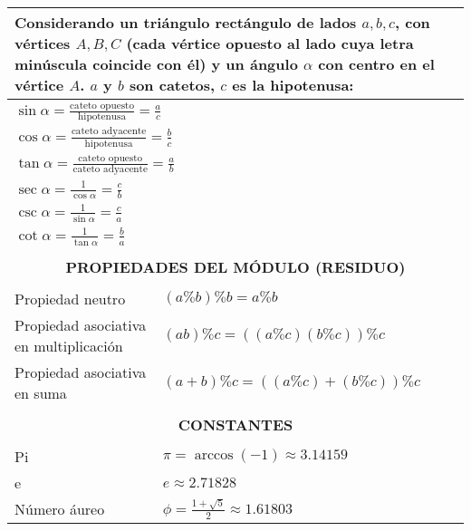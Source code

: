 \begin{center}
{\begin{tabular}{|p{}|p{}|}
\multicolumn{2}{|p{0.96\columnwidth}|}{Considerando un triángulo rectángulo de lados $a,b,c$, con vértices $A,B,C$ (cada vértice opuesto al lado cuya letra minúscula coincide con él) y un ángulo $\alpha$ con centro en el vértice $A$. $a$ y $b$ son catetos, $c$ es la hipotenusa:} \\ \hline

\multicolumn{2}{|p{0.96\columnwidth}|}{$\displaystyle \sin\alpha = \frac{\text{cateto opuesto}}{\text{hipotenusa}} = \frac{a}{c}$} \\ \hline
\multicolumn{2}{|p{0.96\columnwidth}|}{$\displaystyle \cos\alpha = \frac{\text{cateto adyacente}}{\text{hipotenusa}} = \frac{b}{c}$} \\ \hline
\multicolumn{2}{|p{0.96\columnwidth}|}{$\displaystyle \tan\alpha = \frac{\text{cateto opuesto}}{\text{cateto adyacente}} = \frac{a}{b}$} \\ \hline
\multicolumn{2}{|p{0.96\columnwidth}|}{$\displaystyle \sec\alpha = \frac{1}{\cos\alpha} = \frac{c}{b}$} \\ \hline
\multicolumn{2}{|p{0.96\columnwidth}|}{$\displaystyle \csc\alpha = \frac{1}{\sin\alpha} = \frac{c}{a}$} \\ \hline
\multicolumn{2}{|p{0.96\columnwidth}|}{$\displaystyle \cot\alpha = \frac{1}{\tan\alpha} = \frac{b}{a}$} \\ \hline

\multicolumn{2}{|c|}{} \\
\multicolumn{2}{|c|}{\textbf{PROPIEDADES DEL MÓDULO (RESIDUO)}} \\
\multicolumn{2}{|c|}{} \\ \hline

Propiedad neutro & $(a \% b) \% b = a \% b$ \\ \hline
Propiedad asociativa en multiplicación & $(ab) \% c = ((a \% c)(b \% c)) \% c$ \\ \hline
Propiedad asociativa en suma & $(a + b) \% c = ((a \% c) + (b \% c)) \% c$ \\ \hline

\multicolumn{2}{|c|}{} \\
\multicolumn{2}{|c|}{\textbf{CONSTANTES}} \\
\multicolumn{2}{|c|}{} \\ \hline

Pi & $\displaystyle \pi = \arccos(-1) \approx 3.14159$ \\ \hline
e  & $\displaystyle e \approx 2.71828$ \\ \hline
Número áureo & $\displaystyle \phi = \frac{1 + \sqrt{5}}{2} \approx 1.61803$ \\ \hline

\end{tabular}
}
\end{center}
